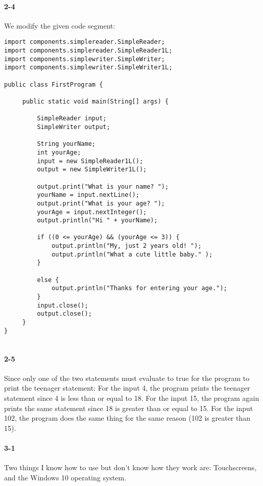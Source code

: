 \documentclass[10pt]{article}
\begin{document}
\paragraph{2-4}

\vspace{30mm}
We modify the given code segment: 
\begin{lstlisting}
import components.simplereader.SimpleReader;
import components.simplereader.SimpleReader1L;
import components.simplewriter.SimpleWriter;
import components.simplewriter.SimpleWriter1L;

public class FirstProgram {
	
	 public static void main(String[] args) {
	 
		 SimpleReader input;
		 SimpleWriter output;
		 
		 String yourName;
		 int yourAge;
		 input = new SimpleReader1L();
		 output = new SimpleWriter1L();
		 
		 output.print("What is your name? ");
		 yourName = input.nextLine();
		 output.print("What is your age? ");
		 yourAge = input.nextInteger();
		 output.println("Hi " + yourName);
		 
		 if ((0 <= yourAge) && (yourAge <= 3)) {
			 output.println("My, just 2 years old! ");
			 output.println("What a cute little baby." );
		 } 
		 
		 else {
			 output.println("Thanks for entering your age.");
		 }
		 input.close();
		 output.close();
	 }
} 


\end{lstlisting}

\paragraph{2-5}
Since only one of the two statements must evaluate to true for the program to print the teenager statement: 
For the input 4, the program prints the teenager statement since 4 is less than or equal to 18. For the input 15, the program again prints the same statement since 18 is greater than or equal to 15. For the input 102, the program does the same thing for the same reason (102 is greater than 15). 

\paragraph{3-1} Two things I know how to use but don't know how they work are: Touchscreens, and the Windows 10 operating system. 
\end{document}
